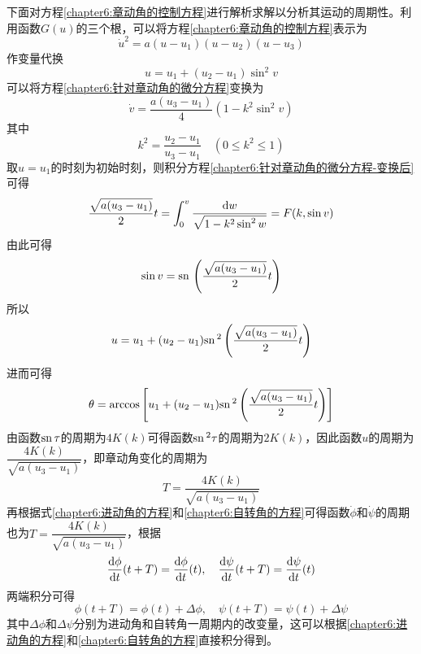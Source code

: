 下面对方程\eqref{chapter6:章动角的控制方程}进行解析求解以分析其运动的周期性。利用函数$G(u)$的三个根，可以将方程\eqref{chapter6:章动角的控制方程}表示为
\begin{equation}
	\dot{u}^2 = a(u-u_1)(u-u_2)(u-u_3)
	\label{chapter6:针对章动角的微分方程}
\end{equation}
作变量代换
\begin{equation}
	u = u_1 + (u_2-u_1)\sin^2v
\end{equation}
可以将方程\eqref{chapter6:针对章动角的微分方程}变换为
\begin{equation}
	\dot{v} = \frac{a(u_3-u_1)}{4}\left(1-k^2\sin^2v\right)
	\label{chapter6:针对章动角的微分方程-变换后}
\end{equation}
其中
\begin{equation}
	k^2=\dfrac{u_2-u_1}{u_3-u_1} \quad (0\leqslant k^2\leqslant 1)
\end{equation}
取$u=u_1$的时刻为初始时刻，则积分方程\eqref{chapter6:针对章动角的微分方程-变换后}可得
\begin{equation}
	\frac{\sqrt{a(u_3-u_1)}}{2}t = \int_0^v \frac{\mathrm{d} w}{\sqrt{1-k^2\sin^2w}} = F(k,\sin v)
\end{equation}
由此可得
\begin{equation}
	\sin v = \mathrm{sn}\, \left(\frac{\sqrt{a(u_3-u_1)}}{2}t\right)
\end{equation}
所以
\begin{equation}
	u = u_1+(u_2-u_1)\mathrm{sn}\,^2 \left(\frac{\sqrt{a(u_3-u_1)}}{2}t\right)
\end{equation}
进而可得
\begin{equation}
	\theta = \arccos \left[u_1+(u_2-u_1)\mathrm{sn}\,^2 \left(\frac{\sqrt{a(u_3-u_1)}}{2}t\right)\right]
\end{equation}
由函数$\mathrm{sn}\, \tau$的周期为$4K(k)$可得函数$\mathrm{sn}\,^2\tau$的周期为$2K(k)$，因此函数$u$的周期为$\dfrac{4K(k)}{\sqrt{a(u_3-u_1)}}$，即章动角变化的周期为
\begin{equation}
	T = \dfrac{4K(k)}{\sqrt{a(u_3-u_1)}}
\end{equation}
再根据式\eqref{chapter6:进动角的方程}和\eqref{chapter6:自转角的方程}可得函数$\dot{\phi}$和$\dot{\psi}$的周期也为$T = \dfrac{4K(k)}{\sqrt{a(u_3-u_1)}}$，根据
\begin{equation}
	\dfrac{\mathrm{d} \phi}{\mathrm{d} t}(t+T) = \dfrac{\mathrm{d} \phi}{\mathrm{d} t}(t),\quad \dfrac{\mathrm{d} \psi}{\mathrm{d} t}(t+T) = \dfrac{\mathrm{d} \psi}{\mathrm{d} t}(t)
\end{equation}
两端积分可得
\begin{equation}
	\phi(t+T)=\phi(t)+\Delta \phi,\quad \psi(t+T)=\psi(t)+\Delta\psi
\end{equation}
其中$\Delta \phi$和$\Delta \psi$分别为进动角和自转角一周期内的改变量，这可以根据\eqref{chapter6:进动角的方程}和\eqref{chapter6:自转角的方程}直接积分得到。

